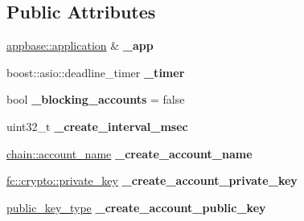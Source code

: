 \subsection*{Public Attributes}
\begin{DoxyCompactItemize}
\item 
\mbox{\label{structaacio_1_1faucet__testnet__plugin__impl_afa14d958c77b7c7cd0a42bc9d8ad24a2}} 
\mbox{\hyperlink{classappbase_1_1application}{appbase\+::application}} \& {\bfseries \+\_\+app}
\item 
\mbox{\label{structaacio_1_1faucet__testnet__plugin__impl_ab2104e69938cbc9fd319c1e5b12a240c}} 
boost\+::asio\+::deadline\+\_\+timer {\bfseries \+\_\+timer}
\item 
\mbox{\label{structaacio_1_1faucet__testnet__plugin__impl_a19d7b29db9b98d14012e6ffbd9a9b354}} 
bool {\bfseries \+\_\+blocking\+\_\+accounts} = false
\item 
\mbox{\label{structaacio_1_1faucet__testnet__plugin__impl_a18eb184e3317961f2cfc352bb734eeaf}} 
uint32\+\_\+t {\bfseries \+\_\+create\+\_\+interval\+\_\+msec}
\item 
\mbox{\label{structaacio_1_1faucet__testnet__plugin__impl_af435e6d5a1f8fa169b09ed8a866f67eb}} 
\mbox{\hyperlink{structaacio_1_1chain_1_1name}{chain\+::account\+\_\+name}} {\bfseries \+\_\+create\+\_\+account\+\_\+name}
\item 
\mbox{\label{structaacio_1_1faucet__testnet__plugin__impl_a1b22543c0b3b496a0cfeab8c3489d744}} 
\mbox{\hyperlink{classfc_1_1crypto_1_1private__key}{fc\+::crypto\+::private\+\_\+key}} {\bfseries \+\_\+create\+\_\+account\+\_\+private\+\_\+key}
\item 
\mbox{\label{structaacio_1_1faucet__testnet__plugin__impl_afa6c97b09e63342c36502deb7ee1d64b}} 
\mbox{\hyperlink{classfc_1_1crypto_1_1public__key}{public\+\_\+key\+\_\+type}} {\bfseries \+\_\+create\+\_\+account\+\_\+public\+\_\+key}
\end{DoxyCompactItemize}
